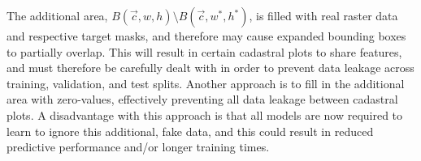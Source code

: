 The additional area, $B(\vec{c}, w, h) \setminus B(\vec{c}, w^*, h^*)$, is filled with real raster data and respective target masks, and therefore may cause expanded bounding boxes to partially overlap.
This will result in certain cadastral plots to share features, and must therefore be carefully dealt with in order to prevent data leakage across training, validation, and test splits.
Another approach is to fill in the additional area with zero-values, effectively preventing all data leakage between cadastral plots.
A disadvantage with this approach is that all models are now required to learn to ignore this additional, fake data, and this could result in reduced predictive performance and/or longer training times.
